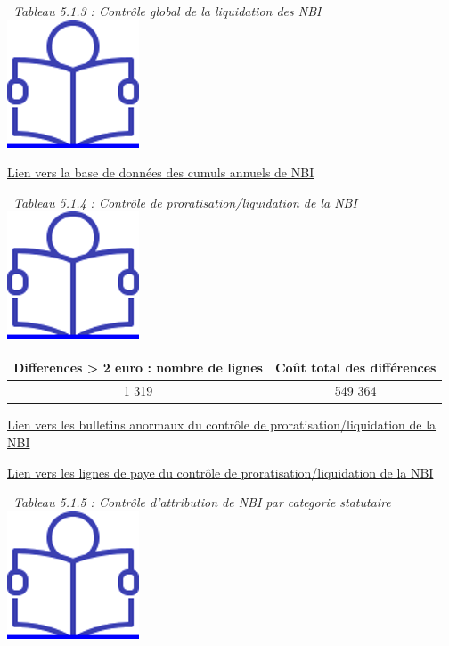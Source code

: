 ~\emph{Tableau 5.1.3 : Contrôle global de la liquidation des NBI} ~
\href{../Docs/Notices/fiche_NBI_glob.odt}{\includegraphics{icones/Notice.png}}

\href{../Bases/Fiabilite/cumuls.nbi.csv}{Lien vers la base de données des
cumuls annuels de NBI}

~\emph{Tableau 5.1.4 : Contrôle de proratisation/liquidation de la NBI}
~
\href{../Docs/Notices/fiche_NBI_prorat.odt}{\includegraphics{icones/Notice.png}}

\begin{longtable}[]{@{}cc@{}}
\toprule
Differences \textgreater{} 2 euro : nombre de lignes & Coût total des
différences\tabularnewline
\midrule
\endhead
1 319 & 549 364\tabularnewline
\bottomrule
\end{longtable}

\href{../Bases/Fiabilite/lignes.nbi.anormales.mensuel.csv}{Lien vers les
bulletins anormaux du contrôle de proratisation/liquidation de la NBI}

\href{../Bases/Fiabilite/lignes.paie.nbi.anormales.mensuel.csv}{Lien vers
les lignes de paye du contrôle de proratisation/liquidation de la NBI}

~\emph{Tableau 5.1.5 : Contrôle d'attribution de NBI par categorie
statutaire} ~
\href{../Docs/Notices/fiche_plafonds_NBI.odt}{\includegraphics{icones/Notice.png}}

